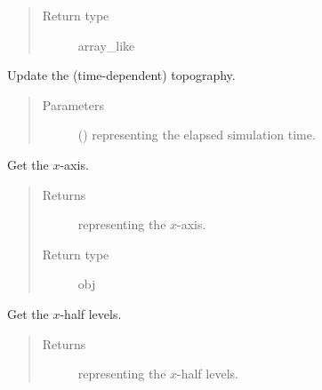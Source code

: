 \documentclass[letterpaper,10pt,english]{sphinxmanual}
\begin{document}
\begin{fulllineitems}
\begin{fulllineitems}
\begin{quote}
\begin{description}
\item[{Return type}] \leavevmode
array\_like

\end{description}\end{quote}

\end{fulllineitems}


\begin{fulllineitems}
\label{\detokenize{api:grids.grid_xyz.GridXYZ.update_topography}}
Update the (time-dependent) topography.
\begin{quote}\begin{description}
\item[{Parameters}] \leavevmode
{} () \textendash{}  representing the elapsed simulation time.

\end{description}\end{quote}

\end{fulllineitems}


\begin{fulllineitems}
\label{\detokenize{api:grids.grid_xyz.GridXYZ.x}}
Get the \(x\)-axis.
\begin{quote}\begin{description}
\item[{Returns}] \leavevmode
{\hyperref[\detokenize{api:grids.axis.Axis}]{}} representing the \(x\)-axis.

\item[{Return type}] \leavevmode
obj

\end{description}\end{quote}

\end{fulllineitems}


\begin{fulllineitems}
\label{\detokenize{api:grids.grid_xyz.GridXYZ.x_half_levels}}
Get the \(x\)-half levels.
\begin{quote}\begin{description}
\item[{Returns}] \leavevmode
{\hyperref[\detokenize{api:grids.axis.Axis}]{}} representing the \(x\)-half levels.


\end{description}
\end{quote}
\end{fulllineitems}
\end{fulllineitems}
\end{document}
